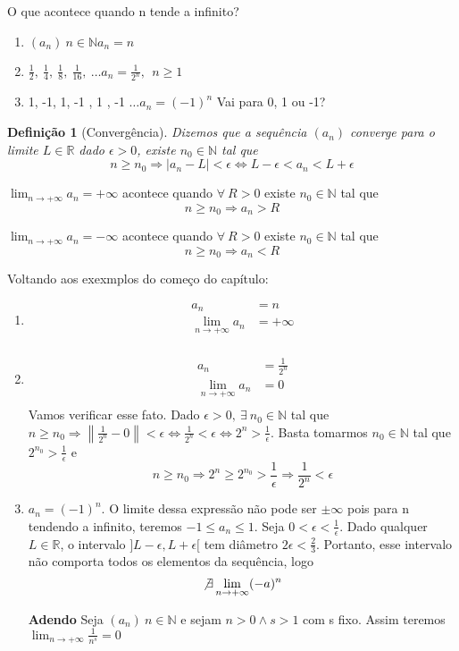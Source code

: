 \documentclass[12pt,openany]{book}
\newtheorem{definition}{Definição}[section]
\begin{document}
O que acontece quando n tende a infinito?

\begin{enumerate}
\item $(a_n) \ n \in \mathds{N} a_n = n$
\item $\frac{1}{2}, \ \frac{1}{4}, \ \frac{1}{8}, \ \frac{1}{16}, \ \hdots a_n = \frac{1}{2^n}, \ \  n\geq 1 $
\item 1, -1, 1, -1 , 1 , -1 $\hdots a_n = (-1)^n $ Vai para 0, 1 ou -1?
\end{enumerate}
\begin{definition}[Convergência]
Dizemos que a sequência $(a_n)$ converge para o limite $L \in \mathds{R}$ dado $\epsilon > 0$, existe $n_0 \in \mathds{N}$ tal que $$ n \geq n_0 \Rightarrow |a_n - L| < \epsilon \Longleftrightarrow L-\epsilon < a_n < L + \epsilon $$
\end{definition}

$\displaystyle{\lim_{n \rightarrow + \infty} a_n = + \infty} $ acontece quando $\forall \ R > 0 $ existe $n_0 \in \mathds{N} $ tal que $$n \geq n_0 \Rightarrow a_n > R$$

$\displaystyle{\lim_{n \rightarrow + \infty} a_n = - \infty} $ acontece quando $\forall \ R > 0 $ existe $n_0 \in \mathds{N} $ tal que $$n \geq n_0 \Rightarrow a_n < R$$

Voltando aos exexmplos do começo do capítulo:
\begin{enumerate}
\item \begin {align*} 
a_n &= n \\
\lim_{n \rightarrow + \infty} a_n &= + \infty\\
\end{align*}
\item \begin{align*}
a_n &= \frac{1}{2^n}\\
\lim_{n \rightarrow + \infty} a_n &= 0\\
\end{align*}
Vamos verificar esse fato. Dado $\epsilon > 0, \ \exists \ n_0 \in \mathds{N}$ tal que $\displaystyle{ n \geq n_0  \Rightarrow \left\| \frac{1}{2^n} - 0 \right\| <  \epsilon \Longleftrightarrow \frac{1}{2^n} < \epsilon \Longleftrightarrow 2^n > \frac{1}{\epsilon}}$.   Basta tomarmos $n_0 \in \mathds{N}$ tal que $\displaystyle{2^{n_0} > \frac{1}{\epsilon}}$ e $$ n \geq n_0 \Rightarrow 2^n \geq 2^{n_0} > \frac{1}{\epsilon} \Rightarrow \frac{1}{2^n} < \epsilon$$
\item $a_n = (-1)^n$. O limite dessa expressão não pode ser $\pm \infty$ pois para n tendendo a infinito, teremos $-1 \leq a_n \leq 1 $.  Seja $\displaystyle{0 < \epsilon < \frac{1}{\epsilon} } $. Dado qualquer $L \in \mathds{R}$, o intervalo $]L- \epsilon, L+ \epsilon[ $ tem diâmetro $\displaystyle{2\epsilon < \frac{2}{3}}$. 
Portanto, esse intervalo não comporta  todos os elementos da sequência, logo $$ \not \exists \lim_{n \rightarrow + \infty} (-a)^n$$
\item [\textbf{Adendo}] Seja $(a_n) \ n \in \mathds{N}$  e sejam $n > 0 \land s > 1$ com s fixo. Assim teremos $\displaystyle{\lim_{n \rightarrow + \infty} \frac{1}{n^s} = 0}$
\end{enumerate}
\end{document}
